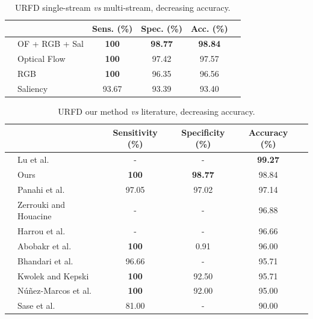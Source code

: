 \documentclass[conference]{IEEEtran}
\begin{document}
\begin{table}[]
\centering
\caption{URFD single-stream \textit{vs} multi-stream, decreasing accuracy.}
\label{tab:urfd-ensem}
\begin{tabular}{llcccl}
\hline
 &  & Sens. (\%) & Spec. (\%) & Acc. (\%) &  \\ \hline
 & OF + RGB + Sal & \textbf{100} & \textbf{98.77} & \textbf{98.84} &  \\
 & Optical Flow & \textbf{100} & 97.42 & 97.57 &  \\
 & RGB & \textbf{100} & 96.35 & 96.56 &  \\
 & Saliency & 93.67 & 93.39 & 93.40 &  \\ \hline
\end{tabular}
\end{table}

\begin{table}[t]
\centering
\caption{URFD our method \textit{vs} literature, decreasing accuracy.}
\label{tab:urfd-our-their}
\begin{tabular}{llcccl}
\hline
 &                                                      & Sensitivity (\%)  & Specificity (\%)  & Accuracy (\%)     & \\ \hline
 & Lu et al.~\cite{lu2018deep}                          & -                 & -                 & \textbf{99.27}    & \\
 & Ours                                                 & \textbf{100}      & \textbf{98.77}    & 98.84             & \\
 & Panahi et al.~\cite{panahi2018human}                 & 97.05             & 97.02             & 97.14             & \\
 & Zerrouki and Houacine~\cite{zerrouki2018combined}    & -                 & -                 & 96.88             & \\
 & Harrou et al.~\cite{harrou2017vision}                & -                 & -                 & 96.66             & \\
 & Abobakr et al.~\cite{abobakr2017skeleton}            & \textbf{100}      & 0.91              & 96.00             & \\
 & Bhandari et al.~\cite{bhandari2017novel}             & 96.66             & -                 & 95.71             & \\
 & Kwolek and Kepski~\cite{kwolek2015improving}         & \textbf{100}      & 92.50             & 95.71             & \\
 & N\'u\~nez-Marcos et al.~\cite{nunez2017vision}       & \textbf{100}      & 92.00             & 95.00             & \\
 & Sase et al.~\cite{sase2018human}                     & 81.00             & -                 & 90.00             & \\ \hline
\end{tabular}
\end{table}
\end{document}
